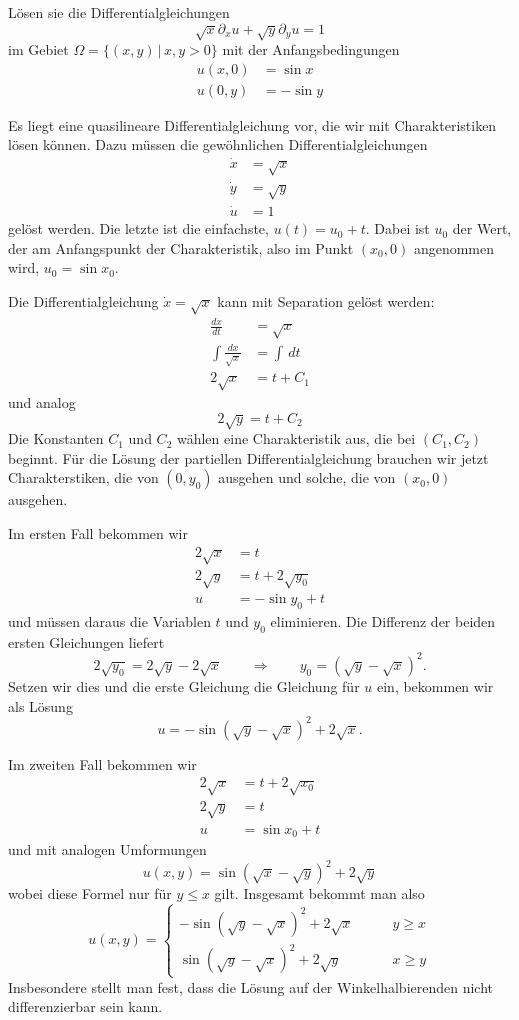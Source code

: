 Lösen sie die Differentialgleichungen
\[
\sqrt{x}\partial_x u+\sqrt{y}\partial_yu=1
\]
im Gebiet $\Omega=\{(x,y)\,|\, x,y>0\}$
mit der Anfangsbedingungen
\begin{align*}
u(x,0)&=\sin x\\
u(0,y)&=-\sin y
\end{align*}

\begin{loesung}
Es liegt eine quasilineare Differentialgleichung vor, die wir mit
Charakteristiken lösen können. Dazu müssen die gewöhnlichen
Differentialgleichungen
\begin{align*}
\dot x &=\sqrt{x} \\
\dot y &=\sqrt{y} \\
\dot u &=1
\end{align*}
gelöst werden. Die letzte ist die einfachste, $u(t)=u_0 + t$. Dabei
ist $u_0$ der Wert, der am Anfangspunkt der Charakteristik, also
im Punkt $(x_0,0)$ angenommen wird, $u_0=\sin x_0$.

Die Differentialgleichung $\dot x=\sqrt{x}$ kann mit Separation
gelöst werden:
\begin{align*}
\frac{dx}{dt}&=\sqrt{x}\\
\int\frac{dx}{\sqrt{x}}&=\int\,dt\\
2\sqrt{x}&=t+C_1
\end{align*}
und analog
\[
2\sqrt{y}=t+C_2
\]
Die Konstanten $C_1$ und $C_2$ wählen eine Charakteristik aus,
die bei $(C_1,C_2)$ beginnt.
Für die Lösung der partiellen Differentialgleichung brauchen wir
jetzt Charakterstiken, die von $(0,y_0)$  ausgehen und solche, die
von $(x_0,0)$ ausgehen.

Im ersten Fall bekommen wir
\begin{align*}
2\sqrt{x}&=t\\
2\sqrt{y}&=t+2\sqrt{y_0}\\
u&=-\sin y_0 + t
\end{align*}
und müssen daraus die Variablen $t$ und $y_0$ eliminieren.
Die Differenz der beiden ersten Gleichungen liefert
\[
2\sqrt{y_0}=2\sqrt{y}-2\sqrt{x}
\qquad\Rightarrow\qquad
y_0
=
(\sqrt{y}-\sqrt{x})^2.
\]
Setzen wir dies und die erste Gleichung die Gleichung für $u$ ein,
bekommen wir als Lösung
\[
u=-\sin
(\sqrt{y}-\sqrt{x})^2+2\sqrt{x}.
\]

Im zweiten Fall bekommen wir
\begin{align*}
2\sqrt{x}&=t+2\sqrt{x_0}\\
2\sqrt{y}&=t\\
u&=\sin x_0+t
\end{align*}
und mit analogen Umformungen
\[
u(x,y)=\sin(\sqrt{x}-\sqrt{y})^2+2\sqrt{y}
\]
wobei diese Formel nur für $y\le x$ gilt. Insgesamt bekommt man also
\[
u(x,y)=
\begin{cases}
-\sin(\sqrt{y}-\sqrt{x})^2 +
2\sqrt{x}&\qquad y \ge x\\
\sin(\sqrt{y}-\sqrt{x})^2 +
2\sqrt{y}&\qquad x \ge y
\end{cases}
\]
Insbesondere stellt man fest, dass die Lösung auf der Winkelhalbierenden
nicht differenzierbar sein kann.


\end{loesung}

